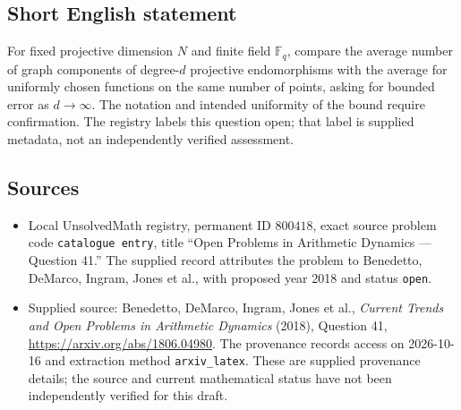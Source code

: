 \documentclass[11pt]{article}
\newcommand{\F}{\mathbb{F}}
\begin{document}
\subsection{Short English statement}
For fixed projective dimension \(N\) and finite field \(\F_q\), compare the average number of graph components of degree-\(d\) projective endomorphisms with the average for uniformly chosen functions on the same number of points, asking for bounded error as \(d\to\infty\). The notation and intended uniformity of the bound require confirmation. The registry labels this question open; that label is supplied metadata, not an independently verified assessment.
\subsection{Sources}
\begin{itemize}
\item Local UnsolvedMath registry, permanent ID \(800418\), exact source problem code \texttt{catalogue entry}, title ``Open Problems in Arithmetic Dynamics --- Question 41.'' The supplied record attributes the problem to Benedetto, DeMarco, Ingram, Jones et al., with proposed year 2018 and status \texttt{open}.
\item Supplied source: Benedetto, DeMarco, Ingram, Jones et al., \emph{Current Trends and Open Problems in Arithmetic Dynamics} (2018), Question 41, \url{https://arxiv.org/abs/1806.04980}. The provenance records access on 2026-10-16 and extraction method \texttt{arxiv\_latex}. These are supplied provenance details; the source and current mathematical status have not been independently verified for this draft.
\end{itemize}
\end{document}
